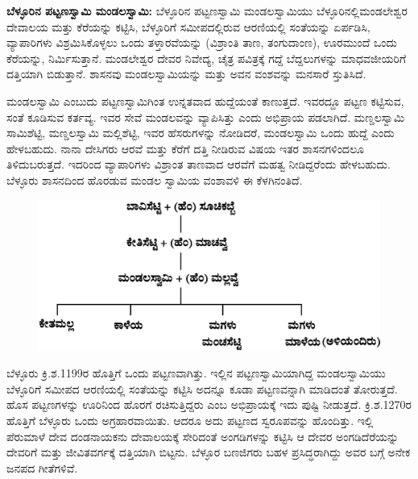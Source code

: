 \textbf{ಬೆಳ್ಳೂರಿನ ಪಟ್ಟಣಸ್ವಾಮಿ ಮಂಡಲಸ್ವಾಮಿ: } ಬೆಳ್ಳೂರಿನ ಪಟ್ಟಣಸ್ವಾಮಿ ಮಂಡಲಸ್ವಾಮಿಯು ಬೆಳ್ಳೂರಿನಲ್ಲಿ\break \hbox{ಮಂಡಲೇಶ್ವರ} ದೇವಾಲಯ ಮತ್ತು ಕೆರೆಯನ್ನು ಕಟ್ಟಿಸಿ, ಬೆಳ್ಳೂರಿಗೆ ಸಮೀಪದಲ್ಲಿರುವ ಆರಣಿಯಲ್ಲಿ ಸಂತೆಯನ್ನು ಏರ್ಪಡಿಸಿ, ವ್ಯಾಪಾರಿಗಳು ವಿಶ್ರಮಿಸಿಕೊಳ್ಳಲು ಒಂದು ತಳ್ತಾರವೆಯನ್ನು (ವಿಶ್ರಾಂತಿ ತಾಣ, ತಂಗುದಾಂಣ), ಊರಮುಂದೆ ಒಂದು ಕೆರೆಯನ್ನು, ನಿರ್ಮಿಸುತ್ತಾನೆ. ಮಂಡಲೇಶ್ವರ ದೇವರ ನಿವೇದ್ಯ, ಚೈತ್ರ ಪವಿತ್ರಕ್ಕೆ ಗದ್ದೆ ಬೆದ್ದಲುಗಳನ್ನು ಮಾಧವಜೀಯರಿಗೆ ದತ್ತಿಯಾಗಿ ಬಿಡುತ್ತಾನೆ. ಶಾಸನವು ಮಂಡಲಸ್ವಾಮಿಯನ್ನು ಮತ್ತು ಅವನ ವಂಶವನ್ನು ಮನಸಾರೆ ಸ್ತುತಿಸಿದೆ.

ಮಂಡಲಸ್ವಾಮಿ ಎಂಬುದು ಪಟ್ಟಣಸ್ವಾಮಿಗಿಂತ ಉನ್ನತವಾದ ಹುದ್ದೆಯಂತೆ ಕಾಣುತ್ತದೆ. ಇವರದ್ದೂ ಪಟ್ಟಣ ಕಟ್ಟಿಸುವ, ಸಂತೆ ಕೂಡಿಸುವ ಕರ್ತವ್ಯ. ಇವರ ಸೇವೆ ಮಂಡಲವನ್ನು ವ್ಯಾಪಿಸಿತ್ತು ಎಂದು ಅಭಿಪ್ರಾಯ ಪಡಲಾಗಿದೆ. ಮಣ್ಡಲಸ್ವಾಮಿ ಸಾಮಿಶೆಟ್ಟಿ, ಮಣ್ಡಲಸ್ವಾಮಿ ಮಲ್ಲಿಶೆಟ್ಟಿ, ಇವರ ಹೆಸರುಗಳನ್ನು ನೋಡಿದರೆ, ಮಂಡಲಸ್ವಾಮಿ ಒಂದು ಹುದ್ದೆ ಎಂದು ಹೇಳಬಹುದು. ನಾನಾ ದೇಸಿಗರು ಆರವೆ ಮತ್ತು ಕೆರೆಗೆ ದತ್ತಿ ನೀಡಿರುವ ವಿಷಯ ಇತರ ಶಾಸನಗಳಿಂದಲೂ ತಿಳಿದುಬರುತ್ತದೆ. ಇದರಿಂದ ವ್ಯಾಪಾರಿಗಳು ವಿಶ್ರಾಂತ ತಾಣವಾದ ಆರವೆಗೆ ಮಹತ್ವ ನೀಡಿದ್ದರೆಂದು ಹೇಳಬಹುದು. ಬೆಳ್ಳೂರು ಶಾಸನದಿಂದ ಹೊರಡುವ ಮಂಡಲ ಸ್ವಾಮಿಯ ವಂಶಾವಳಿ ಈ ಕೆಳಗಿನಂತಿದೆ.

\begin{figure}[!h]
\includegraphics{images/chap8/chap8fig2.jpeg}
\end{figure}

ಬೆಳ್ಳೂರು ಕ್ರಿ.ಶ.1199ರ ಹೊತ್ತಿಗೆ ಒಂದು ಪಟ್ಟಣವಾಗಿತ್ತು. ಇಲ್ಲಿನ ಪಟ್ಟಣಸ್ವಾಮಿಯಾಗಿದ್ದ ಮಂಡಲಸ್ವಾಮಿಯು ಬೆಳ್ಳೂರಿಗೆ ಸಮೀಪದ ಆರಣಿಯಲ್ಲಿ ಸಂತೆಯನ್ನು ಕಟ್ಟಿಸಿ ಅದನ್ನೂ ಕೂಡಾ ಪಟ್ಟಣವನ್ನಾಗಿ ಮಾಡಿದಂತೆ ತೋರುತ್ತದೆ. ಹೊಸ ಪಟ್ಟಣಗಳನ್ನು ಊರಿನಿಂದ ಹೊರಗೆ ರಚಿಸುತ್ತಿದ್ದರು ಎಂಬ ಅಭಿಪ್ರಾಯಕ್ಕೆ ಇದು ಪುಷ್ಟಿ ನೀಡುತ್ತದೆ. ಕ್ರಿ.ಶ.1270ರ ಹೊತ್ತಿಗೆ ಬೆಳ್ಳೂರು ಒಂದು ಅಗ್ರಹಾರವಾಯಿತು. ಆದರೂ ಅದು ಪಟ್ಟಣದ ಸ್ವರೂಪವನ್ನು ಹೊಂದಿತ್ತು. ಇಲ್ಲಿ ಪೆರುಮಾಳೆ ದೇವ ದಂಡನಾಯಕನು ದೇವಾಲಯಕ್ಕೆ ಸೇರಿದಂತೆ ಅಂಗಡಿಗಳನ್ನು ಕಟ್ಟಿಸಿ ಆ ದೇವರ ಅಂಗಡಿದೆರೆಯನ್ನು ದೇವರಿಗೆ ಮತ್ತು ಜೀವಿತವರ್ಗಕ್ಕೆ ದತ್ತಿಯಾಗಿ ಬಿಟ್ಟನು. ಬೆಳ್ಳೂರ ಬಣಜಿಗರು ಬಹಳ ಪ್ರಸಿದ್ಧರಾಗಿದ್ದು ಅವರ ಬಗ್ಗೆ ಅನೇಕ ಜನಪದ ಗೀತೆಗಳಿವೆ.

